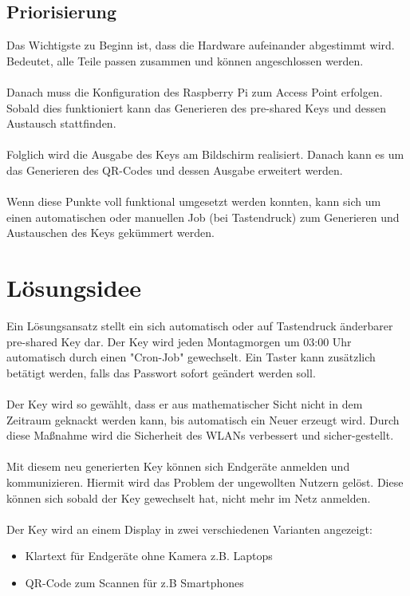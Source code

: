 \documentclass[a4paper,11pt,singlespacing]{article}
\begin{document}
    		\subsection{Priorisierung}
            	Das Wichtigste zu Beginn ist, dass die Hardware aufeinander abgestimmt wird. Bedeutet, alle Teile passen zusammen und können angeschlossen werden. \\ \\ 
            	Danach muss die Konfiguration des Raspberry Pi zum Access Point erfolgen. Sobald dies funktioniert kann das Generieren des pre-shared Keys und dessen Austausch stattfinden. \\ \\ 
            	Folglich wird die Ausgabe des Keys am Bildschirm realisiert. Danach kann es um das Generieren des QR-Codes und dessen Ausgabe erweitert werden.\\ \\ 	
            	Wenn diese Punkte voll funktional umgesetzt werden konnten, kann sich um einen automatischen oder manuellen Job (bei Tastendruck) zum Generieren und Austauschen des Keys gekümmert werden.
    	
	\section{Lösungsidee}
    	Ein Lösungsansatz stellt ein sich automatisch oder auf Tastendruck änderbarer pre-shared Key dar. Der Key wird jeden Montagmorgen um 03:00 Uhr automatisch durch einen "Cron-Job" gewechselt. Ein Taster kann zusätzlich betätigt werden, falls das Passwort sofort geändert werden soll. \\ \\
		Der Key wird so gewählt, dass er aus mathematischer Sicht nicht in dem Zeitraum geknackt werden kann, bis automatisch ein Neuer erzeugt wird. Durch diese Maßnahme wird die Sicherheit des WLANs verbessert und sicher-gestellt.\\ \\
		Mit diesem neu generierten Key können sich Endgeräte anmelden und kommunizieren. Hiermit wird das Problem der ungewollten Nutzern gelöst. Diese können sich sobald der Key gewechselt hat, nicht mehr im Netz anmelden. \\ \\
		Der Key wird an einem Display in zwei verschiedenen Varianten angezeigt:
		\begin{itemize}
			\item Klartext für Endgeräte ohne Kamera z.B. Laptops
			\item QR-Code zum Scannen für z.B Smartphones
		\end{itemize}
		
\end{document}
